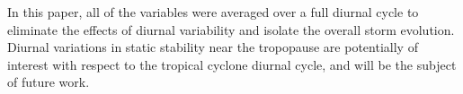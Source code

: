 

In this paper, all of the variables were averaged over a full diurnal cycle to eliminate the effects of diurnal variability and isolate the overall storm evolution.
Diurnal variations in static stability near the tropopause are potentially of interest with respect to the tropical cyclone diurnal cycle, and will be the subject of future work.

